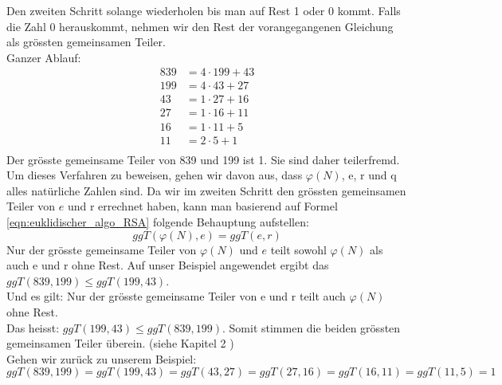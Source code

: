 Den zweiten Schritt solange wiederholen bis man auf Rest 1 oder 0 kommt. Falls die Zahl 0 herauskommt, nehmen wir den Rest der vorangegangenen Gleichung als grössten gemeinsamen Teiler.\\
%
Ganzer Ablauf:
\begin{equation*}
  \begin{split}
    839 &= 4 \cdot 199 + 43\\
    199 &= 4 \cdot 43 + 27\\
    43 &= 1 \cdot 27 + 16\\
    27 &= 1 \cdot 16 + 11\\
    16 &= 1 \cdot 11 + 5\\
    11 &= 2 \cdot 5 + 1\\
    \label{eqn:euqulid_beweis}
  \end{split}
\end{equation*}
%
Der grösste gemeinsame Teiler von 839 und 199 ist 1. Sie sind daher teilerfremd. \\[2ex]
Um dieses Verfahren zu beweisen, gehen wir davon aus, dass $\varphi(N)$, e, r und q alles natürliche  %
Zahlen sind. Da wir im zweiten Schritt den grössten gemeinsamen Teiler von $e$ und r errechnet haben, kann man basierend auf Formel \ref{eqn:euklidischer_algo_RSA} folgende Behauptung aufstellen:
%
\begin{equation}
  ggT(\varphi(N),e) = ggT(e,r)
  \label{eqn:ggT}
\end{equation}
%
Nur der grösste gemeinsame Teiler von $\varphi(N)$ und $e$ teilt sowohl $\varphi(N)$ als auch e und r ohne Rest. Auf unser Beispiel angewendet ergibt das $ggT(839,199) \leq ggT(199,43)$.\\
Und es gilt: Nur der grösste gemeinsame Teiler von e und r teilt auch $\varphi(N)$ ohne Rest.\\
Das heisst: $ggT(199,43) \leq ggT(839,199)$.
Somit stimmen die beiden grössten gemeinsamen Teiler überein. (siehe Kapitel 2 \cite{zahlentheorie_fuer_einsteiger})\\[2ex]
Gehen wir zurück zu unserem Beispiel:
%
\begin{equation*}
 ggT(839,199) = ggT(199,43) = ggT(43,27) = ggT(27,16) = ggT(16,11) = ggT(11,5) = 1
\end{equation*}
%
